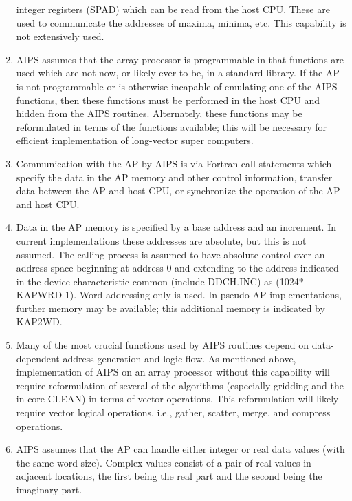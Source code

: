 \begin{enumerate}
integer registers (SPAD) which can be read from the host CPU.  These
are used to communicate the addresses of maxima, minima, etc.  This
capability is not extensively used.
\item AIPS assumes that the array processor is programmable in that
functions are used which are not now, or likely ever to be, in a
standard library.  If the AP is not programmable or is otherwise
incapable of emulating one of the AIPS functions, then these functions
must be performed in the host CPU and hidden from the AIPS routines.
Alternately, these functions may be reformulated in terms of the
functions available; this will be necessary for efficient
implementation of long-vector super computers.
\item Communication with the AP by AIPS is via Fortran call statements which
specify the data in the AP memory and other control information,
transfer data between the AP and host CPU, or synchronize the
operation of the AP and host CPU.
\item Data in the AP memory is specified by a base address and an increment.
In current implementations these addresses are absolute, but this is
not assumed.  The calling process is assumed to have absolute control
over an address space beginning at address 0 and extending to the
address indicated in the device characteristic common (include
DDCH.INC) as (1024$\ast$KAPWRD-1).  Word addressing
only is used.  In pseudo AP implementations, further memory may be
available;  this additional memory is indicated by KAP2WD.
\item Many of the most crucial functions used by AIPS routines depend on
data-dependent address generation and logic flow.  As mentioned
above, implementation of AIPS on an array processor without this
capability will require reformulation of several of the algorithms
(especially gridding and the in-core CLEAN) in terms of vector
operations.  This reformulation will likely require vector logical
operations, i.e., gather, scatter, merge, and compress operations.
\item AIPS assumes that the AP can handle either integer or real data
values (with the same word size).  Complex values consist of a pair
of real values in adjacent locations, the first being the real part
and the second being the imaginary part.
\end{enumerate} %
